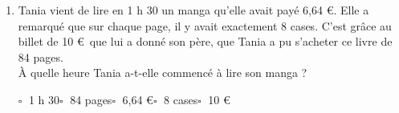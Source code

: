 \documentclass[10pt,a4paper]{article}
\def\columnseprulecolor{\color{Couleur8}} %
\begin{document}
\begin{enumerate}[itemsep=2em]
    	$\square\;$ 440 g\qquad $\square\;$ 14 ans\qquad $\square\;$ 16 ans\qquad $\square\;$ 24 élèves\qquad $\square\;$ 10 livres\qquad 
	\item Tania vient de lire en 1 h 30 un manga qu'elle avait payé 6,64 €. Elle a remarqué que sur chaque page, il y avait exactement 8 cases. C'est grâce au billet de 10 €~que lui a donné son père, que Tania a pu s'acheter ce livre de 84 pages.\\À quelle heure Tania a-t-elle commencé à lire son manga ? 
    
    	$\square\;$ 1 h 30\qquad $\square\;$ 84 pages\qquad $\square\;$ 6,64 €\qquad $\square\;$ 8 cases\qquad $\square\;$ 10 €\qquad 
\end{enumerate}
 

\setlength{\columnsep}{0.75cm}            %
\setlength{\columnseprule}{0pt}      %
\def\columnseprulecolor{\color{Couleur8}} %
\end{document}
